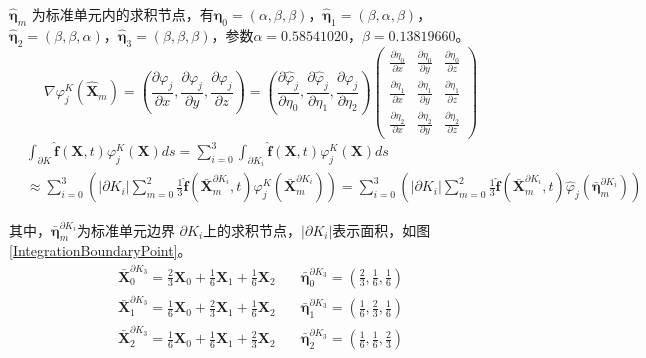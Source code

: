 \documentclass[a4paper, 12pt, UTF8]{ctexart}
\newcommand{\bs}[1]{\boldsymbol{#1}}
\begin{document}
$\hat{\bs{\eta}}_{m}$ 为标准单元内的求积节点，有$\hat{\bs{\eta}}_{0}=(\alpha, \beta, \beta)$，$\hat{\bs{\eta}}_{1}=(\beta,\alpha,  \beta)$，$\hat{\bs{\eta}}_{2}=(\beta, \beta, \alpha)$，$\hat{\bs{\eta}}_{3}=(\beta, \beta, \beta)$，参数$\alpha=0.58541020$，$\beta=0.13819660$。
\begin{equation}
\nabla \varphi_j^{K}(\hat{\bs{X}}_{m}) =
\left(
\frac{\partial \varphi_j}{\partial x}, 
\frac{\partial \varphi_j}{\partial y}, 
\frac{\partial \varphi_j}{\partial z}
\right) 
= 
\left(
\frac{\partial \hat{\varphi}_j}{\partial \eta_0}, 
\frac{\partial \hat{\varphi}_j}{\partial \eta_1}, 
\frac{\partial \hat{\varphi}_j}{\partial \eta_2}
\right)
\begin{pmatrix}
\frac{\partial \eta_0}{\partial x} & \frac{\partial \eta_0}{\partial y} & \frac{\partial \eta_0}{\partial z} \\
\frac{\partial \eta_1}{\partial x} & \frac{\partial \eta_1}{\partial y} & \frac{\partial \eta_1}{\partial z} \\
\frac{\partial \eta_2}{\partial x} & \frac{\partial \eta_2}{\partial y} & \frac{\partial \eta_2}{\partial z}
\end{pmatrix}
\end{equation}
\begin{equation}
\begin{split}
&\int_{\partial K} \hat{\bs{f}}(\bs{X}, t) \varphi_{j}^K(\bs{X}) d s =\sum_{i=0}^{3} \int_{\partial K_{i}} \hat{\bs{f}}(\bs{X}, t) \varphi_{j}^K(\bs{X}) d s \\
&\approx \sum_{i=0}^{3}\left(\left|\partial K_{i}\right| \sum_{m=0}^{2} \frac{1}{3} \hat{\bs{f}}\left(\bar{\bs{X}}^{\partial K_{i}}_{m}, t\right) \varphi_{j}^K\left(\bar{\bs{X}}_{m}^{\partial K_{i}}\right)\right) =
 \sum_{i=0}^{3}\left(\left|\partial K_{i}\right| \sum_{m=0}^{2} \frac{1}{3} \hat{\bs{f}}\left(\bar{\bs{X}}^{\partial K_{i}}_{m}, t\right) \hat{\varphi}_{j}\left(\bar{\bs{\eta}}_{m}^{\partial K_{i}}\right)\right)
\end{split}
\end{equation}

其中，$\bar{\bs{\eta}}_{m}^{\partial K_{i}}$为标准单元边界 $\partial K_{i}$上的求积节点，$|\partial K_{i}|$表示面积，如图\ref{IntegrationBoundaryPoint}。
\begin{equation}
\begin{split}
\bar{\bs{X}}_{0}^{\partial K_{3}}=\frac{2}{3} \bs{X}_{0}+\frac{1}{6} \bs{X}_{1}+\frac{1}{6} \bs{X}_{2} & \quad \bar{\bs{\eta}}_{0}^{\partial K_{3}}=\left(\frac{2}{3}, \frac{1}{6}, \frac{1}{6}\right) \\
\bar{\bs{X}}_{1}^{\partial K_{3}}=\frac{1}{6} \bs{X}_{0}+\frac{2}{3} \bs{X}_{1}+\frac{1}{6} \bs{X}_{2} & \quad \bar{\bs{\eta}}_{1}^{\partial K_{3}}=\left(\frac{1}{6}, \frac{2}{3}, \frac{1}{6}\right) \\
\bar{\bs{X}}_{2}^{\partial K_{3}}=\frac{1}{6} \bs{X}_{0}+\frac{1}{6} \bs{X}_{1}+\frac{2}{3} \bs{X}_{2} & \quad \bar{\bs{\eta}}_{2}^{\partial K_{3}}=\left(\frac{1}{6}, \frac{1}{6}, \frac{2}{3}\right)
\end{split}
\end{equation} 
\end{document}
